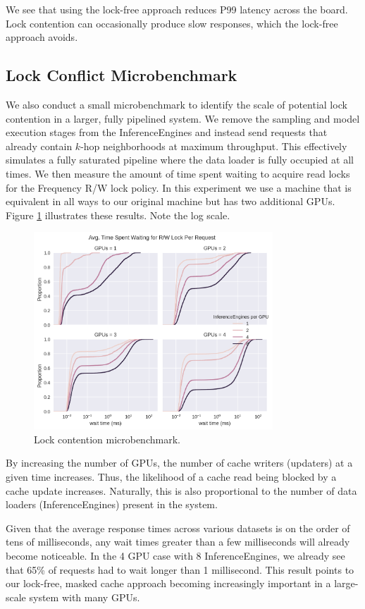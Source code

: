 We see that using the lock-free approach reduces P99 latency across the board. Lock contention can occasionally produce slow responses, which the lock-free approach avoids.

\subsection{Lock Conflict Microbenchmark} \label{Eval: microbenchmark}
We also conduct a small microbenchmark to identify the scale of potential lock contention in a larger, fully pipelined system. 
We remove the sampling and model execution stages from the InferenceEngines and instead send requests that already contain $k$-hop neighborhoods at maximum throughput.
This effectively simulates a fully saturated pipeline where the data loader is fully occupied at all times.
We then measure the amount of time spent waiting to acquire read locks for the Frequency R/W lock policy. 
In this experiment we use a machine that is equivalent in all ways to our original machine but has two additional GPUs. Figure \ref{Eval: Lock conflict microbenchmark} illustrates these results. Note the log scale.
\begin{figure}[h!]
    \centering
    \includegraphics[width=0.8\textwidth]{figures/Lock_Conflicts.png}
    
    \caption{Lock contention microbenchmark.}
    \label{Eval: Lock conflict microbenchmark}
\end{figure}    
By increasing the number of GPUs, the number of cache writers (updaters) at a given time increases. Thus, the likelihood of a cache read being blocked by a cache update increases. Naturally, this is also proportional to the number of data loaders (InferenceEngines) present in the system. 

Given that the average response times across various datasets is on the order of tens of milliseconds, any wait times greater than a few milliseconds will already become noticeable. In the 4 GPU case with 8 InferenceEngines, we already see that 65\% of requests had to wait longer than 1 millisecond. This result points to our lock-free, masked cache approach becoming increasingly important in a large-scale system with many GPUs.

